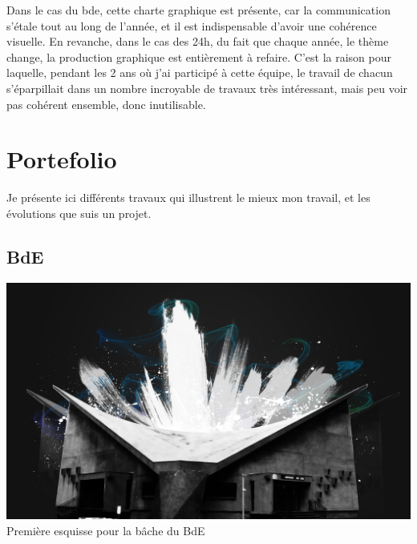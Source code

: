     Dans le cas du bde, cette charte graphique est présente, car la communication s'étale tout au long de l'année, et il est indispensable d'avoir une cohérence visuelle.
    En revanche, dans le cas des 24h, du fait que chaque année, le thème change, la production graphique est entièrement à refaire.
    C'est la raison pour laquelle, pendant les 2 ans où j'ai participé à cette équipe, le travail de chacun s'éparpillait dans un nombre incroyable de travaux très intéressant, mais peu voir pas cohérent ensemble, donc inutilisable.

\newpage

\section{Portefolio}

    Je présente ici différents travaux qui illustrent le mieux mon travail, et les évolutions que suis un projet.
    \subsection{BdE}
        \begin{center}
            \includegraphics[width=\textwidth]{img/amphi.jpg}\\
            Première esquisse pour la bâche du BdE
        \end{center}

